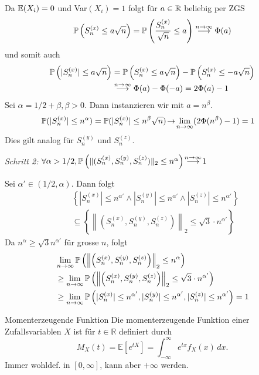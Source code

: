 Da $\E(X_i) = 0$ und Var$(X_i) = 1$ folgt für $a \in \R$ beliebig per ZGS
$$\P\left(S_n^{(x)} \leq a \sqrt{n}\right) = \P\left(\frac{S_n^{(x)}}{\sqrt{n}} \leq a\right) \overset{n \to \infty}{\longrightarrow} \Phi(a)$$
und somit auch
\begin{align*}
    \P\left(|S_n^{(x)}| \leq a\sqrt{n}\right) &= \P\left(S_n^{(x)} \leq a \sqrt{n}\right) -\P\left(S_n^{(x)} \leq - a \sqrt{n}\right) \\
    &\overset{n \to \infty}{\longrightarrow} \Phi(a) - \Phi(-a) = 2\Phi(a)-1
\end{align*}
Sei $\alpha = 1/2 + \beta, \beta > 0$. Dann instanzieren wir mit $a = n^\beta$.
\begin{align*}
    \P(|S_n^{(x)}| \leq n^\alpha) &= \P(|S_n^{(x)}| \leq n^\beta\sqrt{n})\!\rightarrow\! \limn(2 \Phi(n^\beta)-1) = 1
\end{align*}
Dies gilt analog für $S_n^{(y)}$ und $S_n^{(z)}$.

\textit{Schritt 2:} $\forall \alpha > 1/2, \P\left(\lVert(S_n^{(x)}, S_n^{(y)}, S_n^{(z)})\rVert_2 \leq n^\alpha\right)\!\overset{n \to \infty}{\longrightarrow}\! 1$

Sei $\alpha' \in (1/2, \alpha)$. Dann folgt 
\begin{align*}
    &\left\{|S_n^{(x)}| \leq n^{\alpha'} \land |S_n^{(y)}| \leq n^{\alpha'} \land |S_n^{(z)}| \leq n^{\alpha'}\right\} \\
    &\subseteq \left\{\left\lVert\left(S_n^{(x)}, S_n^{(y)}, S_n^{(z)}\right)\right\rVert_2 \leq \sqrt{3} \cdot n^{\alpha'}\right\}
\end{align*}
Da $n^\alpha \geq \sqrt{3}n^{\alpha'}$ für grosse $n$, folgt
\begin{align*}
    &\limn \P\left(\left\lVert\left(S_n^{(x)}, S_n^{(y)}, S_n^{(z)}\right)\right\rVert_2 \leq n^\alpha\right)\\
     &\geq \limn \P\left(\left\lVert\left(S_n^{(x)}, S_n^{(y)}, S_n^{(z)}\right)\right\rVert_2 \leq \sqrt{3} \cdot n^{\alpha'}\right)\\
     &\geq \limn \P\left(|S_n^{(x)}| \leq n^{\alpha'}, |S_n^{(y)}| \leq n^{\alpha'}, |S_n^{(z)}| \leq n^{\alpha'}\right) = 1
\end{align*}

\begin{subbox}{Momenterzeugende Funktion}
Die momenterzeugende Funktion einer Zufallsvariablen $X$ ist für $t \in \mathbb{R}$ definiert durch
\[ M_X(t) = \mathbb{E}\left[e^{tX}\right] = \int_{-\infty}^{\infty} e^{t x} f_X(x) \, dx. \]
Immer wohldef. in $[0, \infty]$, kann aber $+\infty$ werden.
\end{subbox}

